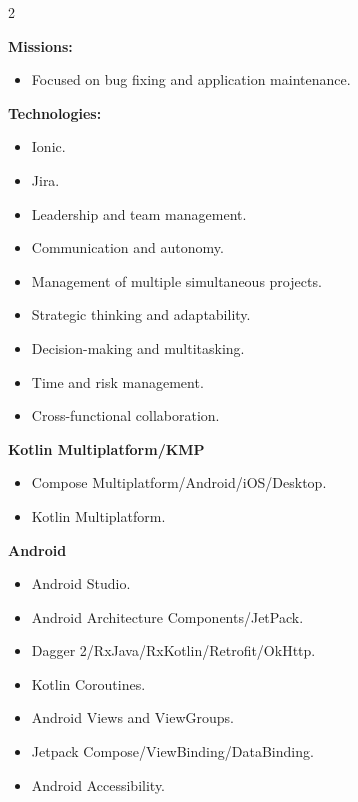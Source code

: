 \documentclass[10pt,a4paper,withhyper]{altacv}
\begin{document}
\begin{paracol}{2}
\divider


\textbf{Missions:}

\begin{itemize}
	\addtolength{\itemindent}{0.1cm}
	\item Focused on bug fixing and application maintenance.
\end{itemize}
	\textbf{Technologies:}	
\begin{itemize}
	\addtolength{\itemindent}{0.1cm}
	\item Ionic.
	\item Jira.
\end{itemize}


\switchcolumn



\begin{itemize}
	\item Leadership and team management.
	\item Communication and autonomy.
	\item Management of multiple simultaneous projects.
	\item Strategic thinking and adaptability.
	\item Decision-making and multitasking.
	\item Time and risk management.
	\item Cross-functional collaboration.
\end{itemize}



\textbf{Kotlin Multiplatform/KMP}

\begin{itemize}
	\item Compose Multiplatform/Android/iOS/Desktop.
	\item Kotlin Multiplatform.
\end{itemize}
\divider

\textbf{Android}

\begin{itemize}
	\item Android Studio.
	\item Android Architecture Components/JetPack.
	\item Dagger 2/RxJava/RxKotlin/Retrofit/OkHttp.
	\item Kotlin Coroutines.
	\item Android Views and ViewGroups.
	\item Jetpack Compose/ViewBinding/DataBinding.
	\item Android Accessibility.
\end{itemize}
\divider


\end{paracol}
\end{document}
